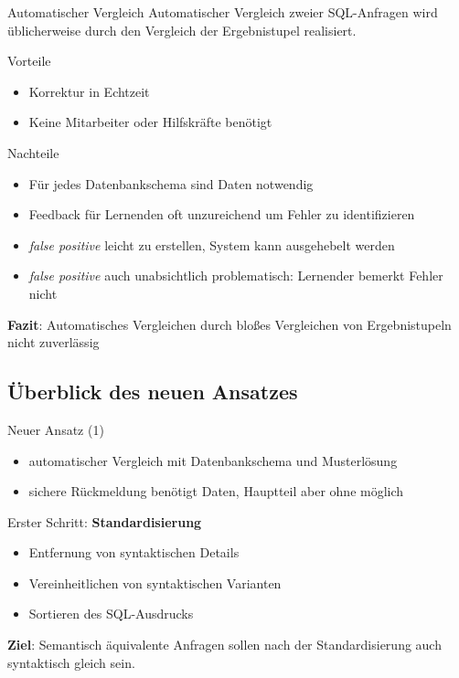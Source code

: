 \documentclass{beamer}
\begin{document}
\begin{frame}{Automatischer Vergleich}
Automatischer Vergleich zweier SQL-Anfragen wird üblicherweise durch den Vergleich der Ergebnistupel realisiert.
\begin{block}{Vorteile}
\begin{itemize}
\item Korrektur in Echtzeit
\item Keine Mitarbeiter oder Hilfskräfte benötigt
\end{itemize}
\end{block}

\begin{alertblock}{Nachteile}
\begin{itemize}
\item Für jedes Datenbankschema sind Daten notwendig
\item Feedback für Lernenden oft unzureichend um Fehler zu identifizieren
\item \textit{false positive} leicht zu erstellen, System kann ausgehebelt werden
\item \textit{false positive} auch unabsichtlich problematisch: Lernender bemerkt Fehler nicht
\end{itemize}
\end{alertblock}

\textbf{Fazit}: Automatisches Vergleichen durch bloßes Vergleichen von Ergebnistupeln nicht zuverlässig
\end{frame}

\subsection{Überblick des neuen Ansatzes}

\begin{frame}{Neuer Ansatz (1)}
\begin{itemize}
\item automatischer Vergleich mit Datenbankschema und Musterlösung
\item sichere Rückmeldung benötigt Daten, Hauptteil aber ohne möglich
\end{itemize}

Erster Schritt: \textbf{Standardisierung}
\begin{itemize}
\item Entfernung von syntaktischen Details
\item Vereinheitlichen von syntaktischen Varianten
\item Sortieren des SQL-Ausdrucks
\end{itemize}
\vspace{5mm}
\textbf{Ziel}: Semantisch äquivalente Anfragen sollen nach der Standardisierung auch syntaktisch gleich sein.
\end{frame}
\end{document}
